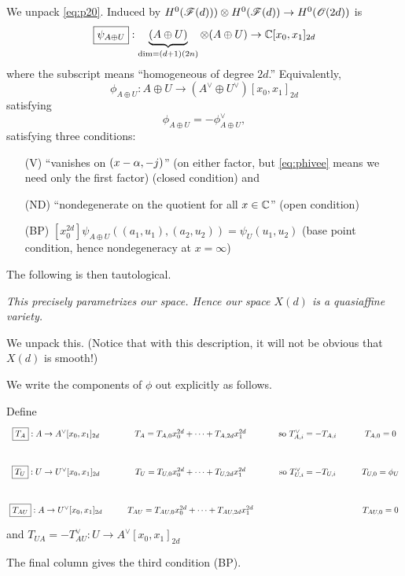 {

We unpack \eqref{eq:p20}.  Induced by $H^0({\mathscr{F}}(d))) \otimes H^0({\mathscr{F}}(d)) \rightarrow H^0({\mathscr{O}}(2d))$ is
$$
\boxed{\psi_{A \oplus U}} : \underbrace{(A \oplus U)}_{\text{dim}=(d+1)(2n)} \otimes (A \oplus U) \rightarrow \mathbb{C}[x_0, x_1]_{2d}$$
where the subscript means ``homogeneous of degree $2d$.'' Equivalently,
$$
\boxed{\phi_{A \oplus U}} : A \oplus U \rightarrow (A^\vee \oplus U^\vee)[x_0, x_1]_{2d}$$
satisfying \begin{equation}
  \label{eq:phivee}
  \phi_{A \oplus U} = - \phi^\vee_{A \oplus U},
  \end{equation}
satisfying three conditions:
\begin{enumerate}
\item[(V)] ``vanishes on $(x-\alpha, -j)$'' (on either factor, but \eqref{eq:phivee} means we need only the first factor) (closed condition) and
  \item[(ND)]  ``nondegenerate on the quotient for all $x \in \mathbb{C}$''  (open condition)
  \item[(BP)] $[x_0^{2d}] \psi_{A \oplus U} ( (a_1, u_1), (a_2, u_2)) = \psi_U(u_1, u_2)$ (base point condition, hence nondegeneracy at $x =\infty$) 
\end{enumerate}

The following is then tautological.

 {\em This precisely parametrizes our space. Hence our space $X(d)$ is a quasiaffine variety.}


We unpack this.  (Notice that with this description, it will not be obvious that $X(d)$ is smooth!)

We write the components of $\phi$ out explicitly as follows.

Define
$$\xymatrix{\boxed{T_A}: A \rightarrow A^\vee[x_0, x_1]_{2d} &
T_A = T_{A,0}x_0^{2d} + \cdots + T_{A,2d} x_1^{2d} & \text{so } T_{A,i}^\vee = - T_{A,i} & T_{A,0}=0 \\
  \boxed{T_U}: U \rightarrow U^\vee[x_0, x_1]_{2d} & T_U = T_{U,0}x_0^{2d} + \cdots + T_{U,2d} x_1^{2d} & \text{so } T_{U,i}^\vee = - T_{U,i} & T_{U,0}=\phi_U  \\
  \boxed{T_{AU}}: A \rightarrow U^\vee[x_0, x_1]_{2d} & T_{AU} = T_{AU,0}x_0^{2d} + \cdots + T_{AU,2d} x_1^{2d} &  & T_{AU,0}=0
}$$
and $\boxed{T_{UA}} = - T_{AU}^\vee: U \rightarrow A^\vee[x_0, x_1]_{2d}$

The final column gives the third condition (BP).

}

